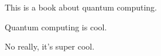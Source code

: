 
This is a book about quantum computing.


Quantum computing is cool.


No really, it's super cool.
